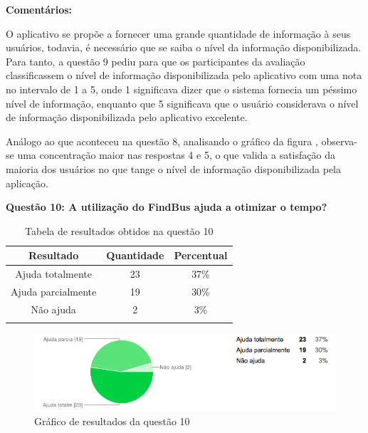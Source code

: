 \textbf{Comentários:}

O aplicativo se propõe a fornecer uma grande quantidade de informação à seus usuários, todavia, é necessário que se saiba o nível da informação disponibilizada. Para tanto, a questão 9 pediu para que os participantes da avaliação classificassem o nível de informação disponibilizada pelo aplicativo com uma nota no intervalo de 1 a 5, onde 1 significava dizer que o sistema fornecia um péssimo nível de informação, enquanto que 5 significava que o usuário considerava o nível de informação disponibilizada pelo aplicativo excelente. 
	
Análogo ao que aconteceu na questão 8, analisando o gráfico da figura , observa-se uma concentração maior nas respostas 4 e 5, o que valida a satisfação da maioria dos usuários no que tange o nível de informação disponibilizada pela aplicação. \newline

\textbf{Questão 10: A utilização do FindBus ajuda a otimizar o tempo?}

\begin{center}
\begin{longtable}{c|c|c}
\hline
    \multicolumn{1}{c}{\textbf{Resultado}} & \multicolumn{1}{c}{\textbf{Quantidade}} & \multicolumn{1}{c}{\textbf{Percentual}} \\
\hline
    Ajuda totalmente & 23 &  37\%\\
    \hline
    Ajuda parcialmente & 19 & 30\%\\
    \hline
    Não ajuda & 2 &  3\%\\
    \hline

\caption{Tabela de resultados obtidos na questão 10}
\label{tabq10}
\end{longtable}
\end{center}


\begin{figure}[h]
\begin{center}
  \includegraphics[width=16cm]{images/graficos/questao10.png}
  \caption{Gráfico de resultados da questão 10}
  \label{fig:questao10}
\end{center}
\end{figure}

